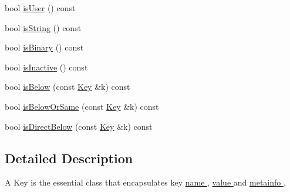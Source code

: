 \begin{DoxyCompactItemize}
bool \hyperlink{classkdb_1_1Key_ab6103772c702b400eaefbc4665f5c0cf}{is\-User} () const 
\item 
bool \hyperlink{classkdb_1_1Key_aa60e37609593de715c342740c76040cc}{is\-String} () const 
\begin{DoxyCompactList}\small\item\em \end{DoxyCompactList}\item 
bool \hyperlink{classkdb_1_1Key_aad92210fe2389ad950a47a4eca428574}{is\-Binary} () const 
\begin{DoxyCompactList}\small\item\em \end{DoxyCompactList}\item 
bool \hyperlink{classkdb_1_1Key_adcd75cc13e9d766eaac72beb7d748bdb}{is\-Inactive} () const 
\begin{DoxyCompactList}\small\item\em \end{DoxyCompactList}\item 
bool \hyperlink{classkdb_1_1Key_a493893308d5b4c54d646cc0df5a076ae}{is\-Below} (const \hyperlink{classkdb_1_1Key}{Key} \&k) const 
\begin{DoxyCompactList}\small\item\em \end{DoxyCompactList}\item 
bool \hyperlink{classkdb_1_1Key_a0d4d2d50f9e3624ade560b0f74267d86}{is\-Below\-Or\-Same} (const \hyperlink{classkdb_1_1Key}{Key} \&k) const 
\begin{DoxyCompactList}\small\item\em \end{DoxyCompactList}\item 
bool \hyperlink{classkdb_1_1Key_a3cc66b309bd42e67d7bc0e4234aa76a1}{is\-Direct\-Below} (const \hyperlink{classkdb_1_1Key}{Key} \&k) const 
\begin{DoxyCompactList}\small\item\em \end{DoxyCompactList}\end{DoxyCompactItemize}


\subsection{Detailed Description}
A Key is the essential class that encapsulates key \hyperlink{group__keyname}{name }, \hyperlink{group__keyvalue}{value } and \hyperlink{group__keymeta}{metainfo }.  


